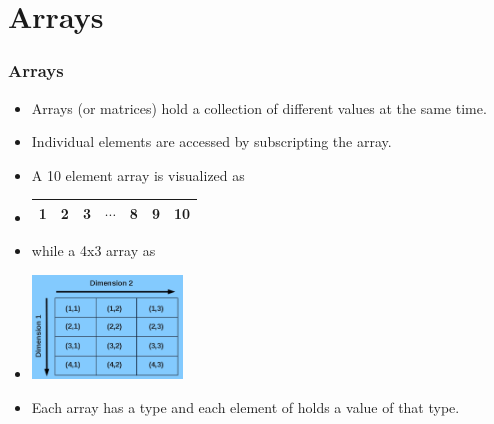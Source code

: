 \documentclass[slidestop,mathserif,compress,xcolor=svgnames]{beamer}
\begin{document}
\section{Arrays}
\begin{frame}[allowframebreaks]
  \frametitle{\small Arrays}
  \begin{block}{}
    \begin{itemize}
      \item Arrays (or matrices) hold a collection of different values at the same time.
      \item Individual elements are accessed by subscripting the array.
      \item A 10 element array is visualized as
      \item[]
      \begin{center}
        \begin{tabular}{|c|c|c|c|c|c|c|}
          \hline
          1 & 2 & 3 & $\cdots$ & 8 & 9 & 10 \\
          \hline
        \end{tabular}
      \end{center}
      \item[] while a 4x3 array as
      \item[]
      \begin{center}
        \includegraphics[width=4cm]{./array1}
      \end{center}
      \item Each array has a type and each element of holds a value of that type.
    \end{itemize}
  \end{block}


\end{frame}
\end{document}
